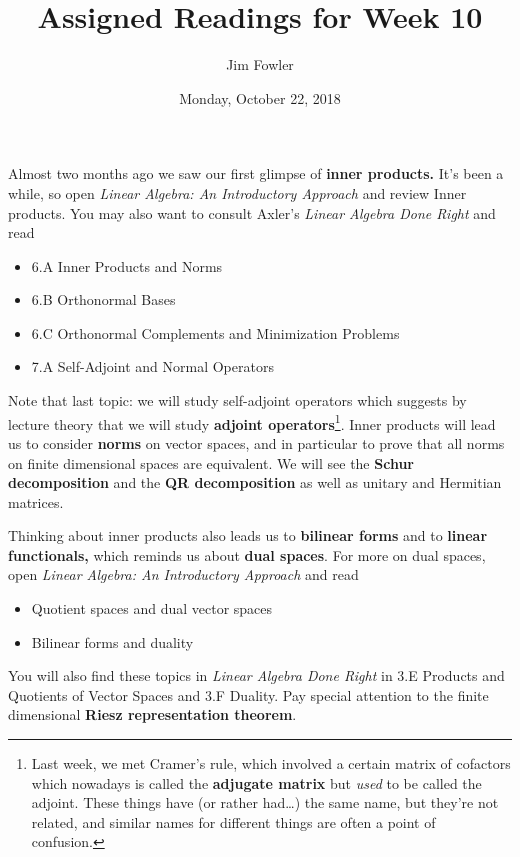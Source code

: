 \documentclass{homework}
\author{Jim Fowler}
\title{Assigned Readings for Week 10}
\date{Monday, October 22, 2018}
\begin{document}
\maketitle

Almost two months ago we saw our first glimpse of \textbf{inner
  products.}  It's been a while, so open \textit{Linear Algebra: An
  Introductory Approach} and review  Inner products.  You may also want to consult Axler's \textit{Linear Algebra Done Right} and read
\begin{itemize}
\item \textsection 6.A Inner Products and Norms
\item \textsection 6.B Orthonormal Bases
\item \textsection 6.C Orthonormal Complements and Minimization Problems
\item \textsection 7.A Self-Adjoint and Normal Operators
\end{itemize}
Note that last topic: we will study self-adjoint operators which
suggests by lecture theory that we will study \textbf{adjoint
  operators}\footnote{Last week, we met Cramer's rule, which involved a
certain matrix of cofactors which nowadays is called the
\textbf{adjugate matrix} but \textit{used} to be called the adjoint.
These things have (or rather had\ldots) the same name, but they're not
related, and similar names for different things are often a point of
confusion.}.  Inner products will lead us to consider \textbf{norms} on vector
spaces, and in particular to prove that all norms on finite
dimensional spaces are equivalent.  We will see the \textbf{Schur decomposition} and the \textbf{QR decomposition} as well as unitary and Hermitian matrices.

Thinking about inner products also leads us to \textbf{bilinear forms}
and to \textbf{linear functionals,} which  reminds us about
\textbf{dual spaces}.  For more on dual spaces, open \textit{Linear
  Algebra: An Introductory Approach} and read
\begin{itemize}
\item {} Quotient spaces and dual vector spaces
\item {} Bilinear forms and duality
\end{itemize}
You will also find these topics in \textit{Linear Algebra Done Right}
in \textsection 3.E Products and Quotients of Vector Spaces and
\textsection 3.F Duality.  Pay special attention to the finite dimensional \textbf{Riesz representation theorem}.
\end{document}
